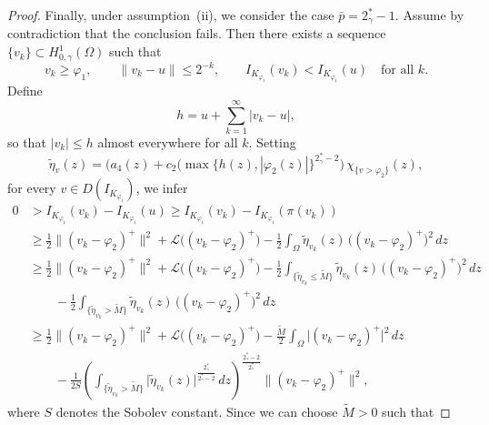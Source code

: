 \documentclass[11pt]{article}
\newcommand{\spacegr}{H^{1}_{0,\gamma}(\Omega)}
\begin{document}
\begin{proof}
\medskip

Finally, under assumption~\textnormal{(ii)}, we consider the case $\bar{p} = 2_{\gamma}^{\ast} - 1$. 
Assume by contradiction that the conclusion fails. Then there exists a sequence $\{v_k\} \subset \spacegr$ such that
\begin{equation*}
v_k \ge \varphi_1, \qquad \| v_k - u \| \le 2^{-k}, \qquad I_{K_{\varphi_1}}(v_k) < I_{K_{\varphi_1}}(u)
\quad \text{for all } k .
\end{equation*}
Define
\begin{equation*}
h = u + \sum_{k=1}^{\infty} | v_k - u | ,
\end{equation*}
so that $|v_k| \le h$ almost everywhere for all $k$. Setting
\begin{equation*}
\tilde{\eta}_v(z) = \bigl( a_4(z) + c_2 ( \max \{ h(z), |\varphi_2(z)| \}^{2_{\gamma}^{\ast}-2} \bigr)\, \chi_{\{ v > \varphi_2 \}}(z),
\end{equation*}
for every $v \in D(I_{K_{\varphi_1}})$, we infer
\begin{equation*}
\begin{aligned}
0 &> I_{K_{\varphi_1}}(v_k) - I_{K_{\varphi_1}}(u)
\ge I_{K_{\varphi_1}}(v_k) - I_{K_{\varphi_1}}(\pi(v_k)) \\
&\ge \frac{1}{2} \bigl\| (v_k-\varphi_2)^{+} \bigr\|^{2}
+ \mathcal{L}\bigl( (v_k-\varphi_2)^{+} \bigr)
- \frac{1}{2} \int_{\Omega} \tilde{\eta}_{v_k}(z)\, \bigl( (v_k-\varphi_2)^{+} \bigr)^{2}\, dz \\
& \ge \frac{1}{2} \bigl\| (v_k-\varphi_2)^{+} \bigr\|^{2}
+ \mathcal{L}\bigl( (v_k-\varphi_2)^{+} \bigr)
- \frac{1}{2} \int_{\{ \tilde{\eta}_{v_k} \le \tilde{M} \}} \tilde{\eta}_{v_k}(z)\, \bigl( (v_k-\varphi_2)^{+} \bigr)^{2}\, dz \\
& \qquad
- \frac{1}{2} \int_{\{ \tilde{\eta}_{v_k} > \tilde{M} \}} \tilde{\eta}_{v_k}(z)\, \bigl( (v_k-\varphi_2)^{+} \bigr)^{2}\, dz \\
& \ge \frac{1}{2} \bigl\| (v_k-\varphi_2)^{+} \bigr\|^{2}
+ \mathcal{L}\bigl( (v_k-\varphi_2)^{+} \bigr)
- \frac{\tilde{M}}{2} \int_{\Omega} \bigl| (v_k-\varphi_2)^{+} \bigr|^{2}\, dz \\
& \qquad
- \frac{1}{2S} \left( \int_{\{ \tilde{\eta}_{v_k} > \tilde{M} \}} \lvert \tilde{\eta}_{v_k}(z) \rvert^{\frac{2_{\gamma}^{\ast}}{2_{\gamma}^{\ast}-2}}\, dz \right)^{\frac{2_{\gamma}^{\ast}-2}{2_{\gamma}^{\ast}}}
\bigl\| (v_k-\varphi_2)^{+} \bigr\|^{2},
\end{aligned}
\end{equation*}
where $S$ denotes the Sobolev constant. Since we can choose $\tilde{M} > 0$ such that

\end{proof}
\end{document}

